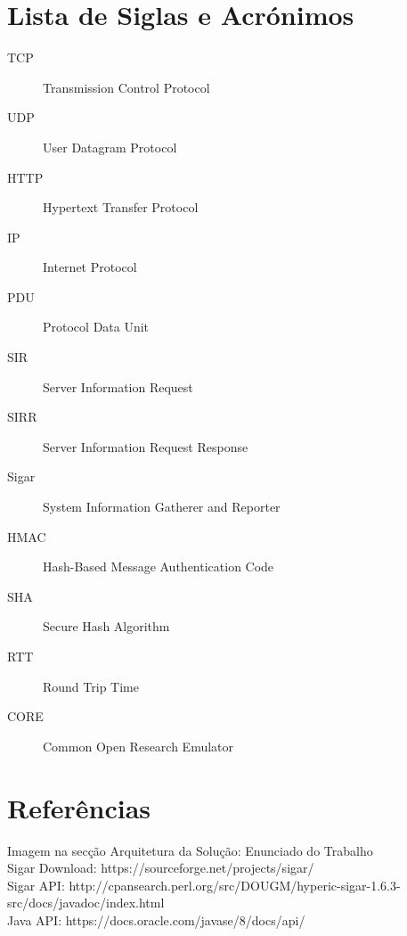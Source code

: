 \documentclass{article}
\begin{document}
\section{Lista de Siglas e Acrónimos}
\begin{description}
    \item [TCP] Transmission Control Protocol
    \item [UDP] User Datagram Protocol
    \item [HTTP] Hypertext Transfer Protocol
    \item [IP] Internet Protocol
    \item [PDU] Protocol Data Unit
    \item [SIR] Server Information Request
    \item [SIRR] Server Information Request Response
    \item [Sigar] System Information Gatherer and Reporter
    \item [HMAC] Hash-Based Message Authentication Code
    \item [SHA] Secure Hash Algorithm
    \item [RTT] Round Trip Time
    \item [CORE] Common Open Research Emulator
\end{description}

\section{Referências}
Imagem na secção Arquitetura da Solução: Enunciado do Trabalho\\
Sigar Download: https://sourceforge.net/projects/sigar/\\
Sigar API: http://cpansearch.perl.org/src/DOUGM/hyperic-sigar-1.6.3-src/docs/javadoc/index.html\\
Java API: https://docs.oracle.com/javase/8/docs/api/\\
\end{document}
